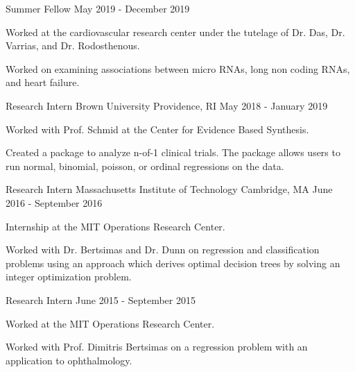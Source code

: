 \begin{cventries}
  \cventry
    {Summer Fellow} %
    {} %
    {} %
    {May 2019 - December 2019} %
    {
      \begin{cvitems} %
        \item {Worked at the cardiovascular research center under the tutelage of Dr. Das, Dr. Varrias, and Dr. Rodosthenous.} 
        \item {Worked on examining associations between micro RNAs, long non
        coding RNAs, and heart failure.}
      \end{cvitems}
    }

\vspace{-1mm}
  \cventry
    {Research Intern} %
    {Brown University} %
    {Providence, RI} %
    {May 2018 - January 2019} %
    {
      \begin{cvitems} %
        \item {Worked with Prof. Schmid at the Center for Evidence Based Synthesis.} 
        \item {Created a package to analyze n-of-1 clinical trials. The package
        allows users to run normal, binomial, poisson, or ordinal regressions
        on the data.}
      \end{cvitems}
    }

  \cventry
    {Research Intern} %
    {Massachusetts Institute of Technology} %
    {Cambridge, MA} %
    {June 2016 - September 2016} %
    {
      \begin{cvitems} %
        \item {Internship at the MIT Operations Research Center.}
        \item {Worked with Dr. Bertsimas and Dr. Dunn on regression and
        classification problems using an approach which derives optimal decision
        trees by solving an integer optimization problem.}
      \end{cvitems}
    }

  \cventry
    {Research Intern} %
    {} %
    {} %
    {June 2015 - September 2015} %
    {
      \begin{cvitems} %
        \item {Worked at the MIT Operations Research Center.}
        \item {Worked with Prof. Dimitris Bertsimas on a regression problem
        with an application to ophthalmology.}
      \end{cvitems}
    }

\end{cventries}
